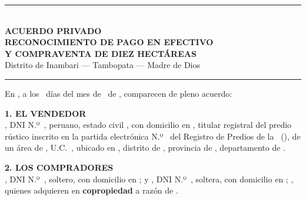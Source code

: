 \documentclass[12pt,a4paper]{article}
\begin{document}


\pagestyle{empty}
\renewcommand{\expedienteCorto}{}
\renewcommand{\codigoDoc}{}

\begin{center}
{\color{tinta}\rule{0.88\textwidth}{1.6pt}}\\[0.75em]
{\Large\bfseries\color{tinta}ACUERDO PRIVADO}\\[0.25em]
{\large\bfseries\color{tinta}RECONOCIMIENTO DE PAGO EN EFECTIVO}\\[0.15em]
{\large\bfseries\color{tinta}Y COMPRAVENTA DE DIEZ HECTÁREAS}\\[0.45em]
{\normalsize Distrito de Inambari --- Tambopata --- Madre de Dios}\\[0.35em]
{\color{tinta}\rule{0.88\textwidth}{1.6pt}}
\end{center}

\vspace{0.55em}
\begin{center}
\end{center}

\vspace{0.85em}
\noindent En \textbf{\LugarOtorgamiento}, a los \DiaOtorgamiento\ días del mes de \MesOtorgamiento\ de \AnioOtorgamiento, comparecen de pleno acuerdo:

\vspace{0.55em}
\noindent\textbf{1. EL VENDEDOR}\\[0.2em]
\textbf{\VendedorNombreCompleto}, DNI N.º\ \VendedorDNI, peruano, estado civil \VendedorEstadoCivil, con domicilio en \linea[8.2cm], titular registral del predio rústico inscrito en la partida electrónica N.º\ \textbf{\PartidaMatriz} del Registro de Predios de la \OficinaRegistral\ (\ZonaRegistral), de un área de \AreaMatriz, U.C.\ \UnidadCatastral, ubicado en \UbicacionRegistral, distrito de \Distrito, provincia de \Provincia, departamento de \Departamento.

\vspace{0.55em}
\noindent\textbf{2. LOS COMPRADORES}\\[0.2em]
\textbf{\CompradorUnoNombre}, DNI N.º\ \CompradorUnoDNI, soltero, con domicilio en \CompradorUnoDomicilio; y \textbf{\CompradorDosNombre}, DNI N.º\ \CompradorDosDNI, soltera, con domicilio en \CompradorDosDomicilio; \textbf{\CompradorParentesco}, quienes adquieren en \textbf{copropiedad} a razón de \PorcentajeCopropiedad.
\end{document}
